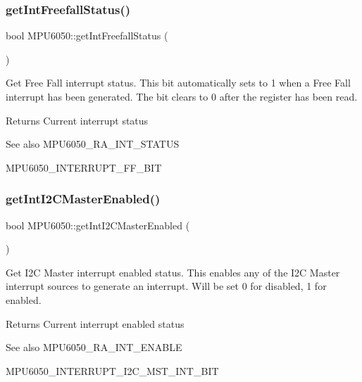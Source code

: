 \subsubsection{\texorpdfstring{getIntFreefallStatus()}{getIntFreefallStatus()}}
{\footnotesize\ttfamily bool M\+P\+U6050\+::get\+Int\+Freefall\+Status (\begin{DoxyParamCaption}{ }\end{DoxyParamCaption})}

Get Free Fall interrupt status. This bit automatically sets to 1 when a Free Fall interrupt has been generated. The bit clears to 0 after the register has been read. \begin{DoxyReturn}{Returns}
Current interrupt status 
\end{DoxyReturn}
\begin{DoxySeeAlso}{See also}
M\+P\+U6050\+\_\+\+R\+A\+\_\+\+I\+N\+T\+\_\+\+S\+T\+A\+T\+US 

M\+P\+U6050\+\_\+\+I\+N\+T\+E\+R\+R\+U\+P\+T\+\_\+\+F\+F\+\_\+\+B\+IT 
\end{DoxySeeAlso}
\mbox{\label{class_m_p_u6050_a282ae29e029d88604a59c92bdf9ce252}} 
\subsubsection{\texorpdfstring{getIntI2CMasterEnabled()}{getIntI2CMasterEnabled()}}
{\footnotesize\ttfamily bool M\+P\+U6050\+::get\+Int\+I2\+C\+Master\+Enabled (\begin{DoxyParamCaption}{ }\end{DoxyParamCaption})}

Get I2C Master interrupt enabled status. This enables any of the I2C Master interrupt sources to generate an interrupt. Will be set 0 for disabled, 1 for enabled. \begin{DoxyReturn}{Returns}
Current interrupt enabled status 
\end{DoxyReturn}
\begin{DoxySeeAlso}{See also}
M\+P\+U6050\+\_\+\+R\+A\+\_\+\+I\+N\+T\+\_\+\+E\+N\+A\+B\+LE 

M\+P\+U6050\+\_\+\+I\+N\+T\+E\+R\+R\+U\+P\+T\+\_\+\+I2\+C\+\_\+\+M\+S\+T\+\_\+\+I\+N\+T\+\_\+\+B\+IT 
\end{DoxySeeAlso}
\mbox{\label{class_m_p_u6050_a31d6c2b03fc2d6ce82d67d142f316851}} 
